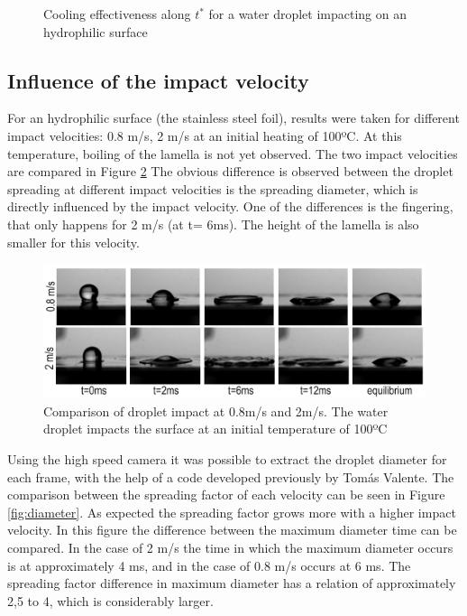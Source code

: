 \begin{figure}[h!]
\centering
{}
\caption{Cooling effectiveness along $t^*$ for a water droplet impacting on an hydrophilic surface}
\label{fig:coolex}
\end{figure}

\subsection{Influence of the impact velocity}

\par For an hydrophilic surface (the stainless steel foil), results were taken for different impact velocities: 0.8 m/s, 2 m/s at an initial heating of 100ºC. At this temperature, boiling of the lamella is not yet observed. The two impact velocities are compared in Figure \ref{fig:hsspeed} The obvious difference is observed between the droplet spreading at different impact velocities is the spreading diameter, which is directly influenced by the impact velocity. One of the differences is the fingering, that only happens for 2 m/s (at t= 6ms). The height of the lamella is also smaller for this velocity.\\

\begin{figure}[h]
\centering
\includegraphics[width=1\linewidth]{Figures/5.Chapter/hsspeed.png}
\caption{Comparison of droplet impact at 0.8m/s and 2m/s. The water droplet impacts the surface at an initial temperature of 100ºC}
\label{fig:hsspeed}
\end{figure}

\par Using the high speed camera it was possible to extract the droplet diameter for each frame, with the help of a code developed previously by Tomás Valente. The comparison between the spreading factor of each velocity can be seen in Figure \ref{fig:diameter}. As expected the spreading factor grows more with a higher impact velocity. In this figure the difference between the maximum diameter time can be compared. In the case of 2 m/s the time in which the maximum diameter occurs is at approximately 4 ms, and in the case of 0.8 m/s occurs at 6 ms. The spreading factor difference in maximum diameter has a relation of approximately 2,5 to 4, which is considerably larger.\\

